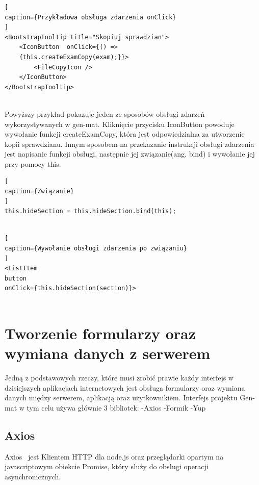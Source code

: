 \documentclass[oneside,polski,logo,indent]{amuthesis}
\begin{document}
\begin{enumerate}
\begin{enumerate}
{\begin{lstlisting}[
caption={Przykładowa obsługa zdarzenia onClick}
]
<BootstrapTooltip title="Skopiuj sprawdzian">
	<IconButton  onClick={() => 
	{this.createExamCopy(exam);}}>
		<FileCopyIcon />
	</IconButton>
</BootstrapTooltip>


\end{lstlisting}

}
Powyższy przykład pokazuje jeden ze sposobów obsługi zdarzeń wykorzystywanych w gen-mat. Kliknięcie przycisku IconButton powoduje wywołanie funkcji createExamCopy, która jest odpowiedzialna za utworzenie kopii sprawdzianu.
Innym sposobem na przekazanie instrukcji obsługi zdarzenia jest napisanie funkcji obsługi, następnie jej związanie(ang. bind) i wywołanie jej przy pomocy this.

\begin{lstlisting}[
caption={Związanie}
]
this.hideSection = this.hideSection.bind(this);


\end{lstlisting}

\begin{lstlisting}[
caption={Wywołanie obsługi zdarzenia po związaniu}
]
<ListItem
button 
onClick={this.hideSection(section)}>


\end{lstlisting}



\section{Tworzenie formularzy oraz wymiana danych z serwerem}
\bigbreak
Jedną z podstawowych rzeczy, które musi zrobić prawie każdy interfejs w dzisiejszych aplikacjach internetowych jest obsługa formularzy oraz wymiana danych między serwerem, aplikacją oraz użytkownikiem. Interfejs projektu Gen-mat w tym celu używa głównie 3 bibliotek:
\newline
-Axios
\newline
-Formik
\newline
-Yup

\subsection{Axios}
Axios~\cite{axios} jest Klientem HTTP dla node.js oraz przeglądarki opartym na javascriptowym obiekcie Promise, który służy do obsługi operacji asynchronicznych.


\end{enumerate}
\end{enumerate}
\end{document}
